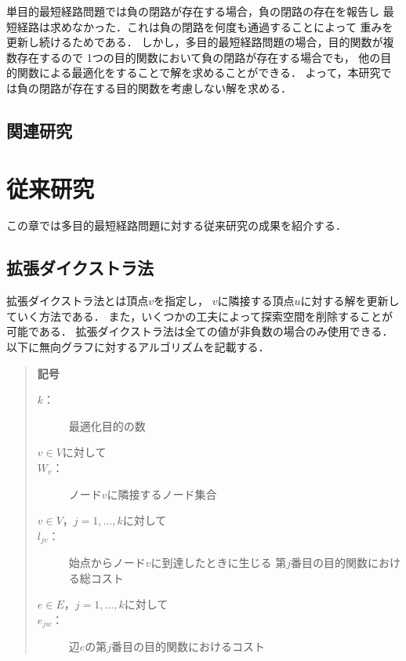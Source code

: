 \documentclass[12pt]{optlab-bachelor}
\begin{document}
単目的最短経路問題では負の閉路が存在する場合，負の閉路の存在を報告し
最短経路は求めなかった．これは負の閉路を何度も通過することによって
重みを更新し続けるためである．
しかし，多目的最短経路問題の場合，目的関数が複数存在するので
1つの目的関数において負の閉路が存在する場合でも，
他の目的関数による最適化をすることで解を求めることができる．
よって，本研究では負の閉路が存在する目的関数を考慮しない解を求める．


\section{関連研究}



\chapter{従来研究}
この章では多目的最短経路問題に対する従来研究の成果を紹介する．

\section{拡張ダイクストラ法}
拡張ダイクストラ法とは頂点$v$を指定し，
$v$に隣接する頂点$u$に対する解を更新していく方法である．
また，いくつかの工夫によって探索空間を削除することが可能である．
拡張ダイクストラ法は全ての値が非負数の場合のみ使用できる．
以下に無向グラフに対するアルゴリズムを記載する．

\begin{quote}
  \textbf{記号}
  \begin{description}
    \item[$k$：] 最適化目的の数
    \item[$v \in V$に対して]
    \item[$W_v$：] ノード$v$に隣接するノード集合
    \item[$v \in V$，$j = 1 , \ldots , k$に対して]
    \item[$l_{jv}$：] 始点からノード$v$に到達したときに生じる
    第$j$番目の目的関数における総コスト
    \item[$e \in E$，$j = 1 , \ldots , k$に対して]
    \item[$e_{jw}$：] 辺$e$の第$j$番目の目的関数におけるコスト
  \end{description}
\end{quote}
\end{document}
